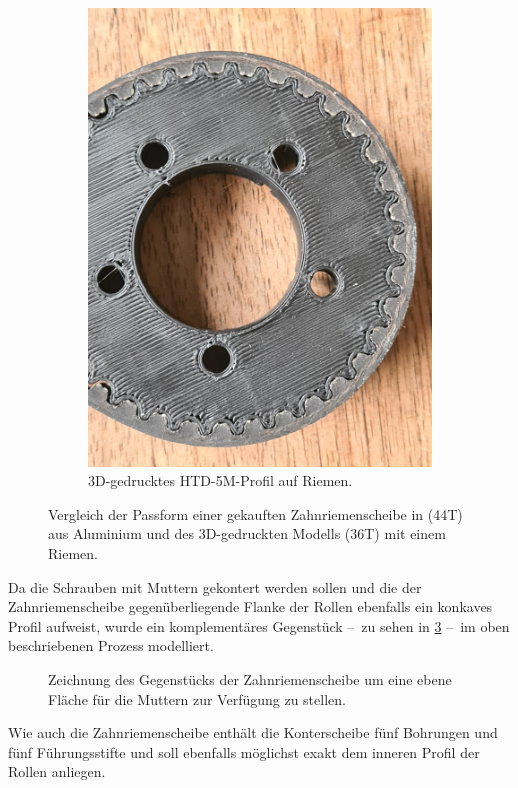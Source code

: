 \begin{figure}[h]
\begin{subfigure}{.49\textwidth}
				\includegraphics[width=\textwidth]{Footage/Pictures/Printed-HTD_tooth_fit.jpg}
				\caption{3D-gedrucktes HTD-5M-Profil auf Riemen.}%
				\label{subfig:printed HTD}
			\end{subfigure}
			\caption[Vergleich der Passform einer gekauften mit einer 3D-gedruckten Zahnriemenscheibe]{Vergleich der Passform einer gekauften Zahnriemenscheibe in (44T) aus Aluminium und des 3D-gedruckten Modells (36T) mit einem Riemen.}%
			\label{fig:HTD profiles comparison}
		\end{figure}\par\medskip
		Da die Schrauben mit Muttern gekontert werden sollen und die der Zahnriemenscheibe gegenüberliegende Flanke der Rollen ebenfalls ein konkaves Profil aufweist, wurde ein komplementäres Gegenstück --~zu sehen in \cref{fig:orangatang kegel flat face} --~im oben beschriebenen Prozess modelliert.
		\begin{figure}[h]
			\centering
			
			\caption[Zeichnung des Gegenstücks der Zahnriemenscheibe]{Zeichnung des Gegenstücks der Zahnriemenscheibe um eine ebene Fläche für die Muttern zur Verfügung zu stellen.}%
			\label{fig:orangatang kegel flat face}
		\end{figure}
		Wie auch die Zahnriemenscheibe enthält die Konterscheibe fünf Bohrungen und fünf Führungsstifte und soll ebenfalls möglichst exakt dem inneren Profil der Rollen anliegen.
		
